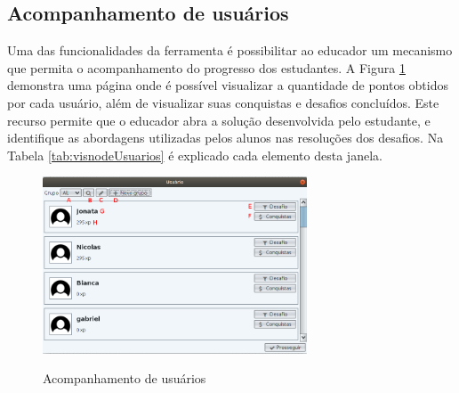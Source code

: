 \documentclass[
	12pt,				%
	oneside,			%
	a4paper,			%
	english,			%
	french,				%
	spanish,			%
	brazil,				%
	]{abntex2}
\begin{document}
\subsection{Acompanhamento de usuários}

Uma das funcionalidades da ferramenta é possibilitar ao educador um mecanismo que permita o acompanhamento do progresso dos estudantes. A Figura \ref{fig:visnodeUsuarios} demonstra uma página onde é possível visualizar a quantidade de pontos obtidos por cada usuário, além de visualizar suas conquistas e desafios concluídos. Este recurso permite que o educador abra a solução desenvolvida pelo estudante, e identifique as abordagens utilizadas pelos alunos nas resoluções dos desafios. Na Tabela \ref{tab:visnodeUsuarios} é explicado cada elemento desta janela.

\begin{figure}[H]
\centering
\caption{Acompanhamento de usuários}
\includegraphics[width=0.7\textwidth]{imagens/visnode_usuarios.png}
\sourceAuthor
\label{fig:visnodeUsuarios}
\end{figure}
\end{document}
